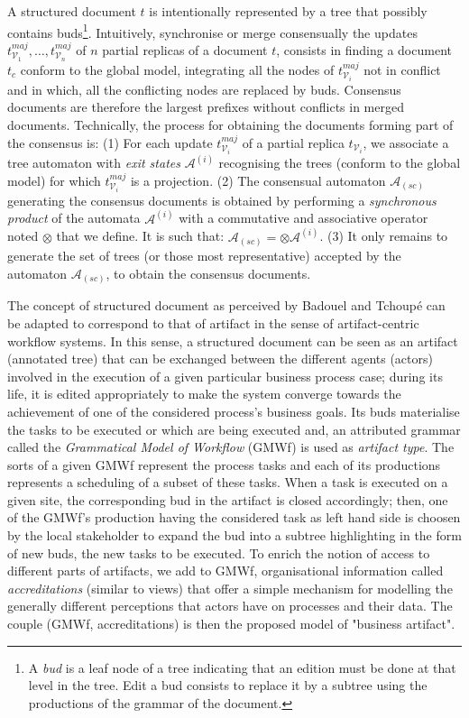 A structured document $t$ is intentionally represented by a tree that possibly contains buds\footnote{A \textit{bud} is a leaf node of a tree indicating that an edition must be done at that level in the tree. Edit a bud consists to replace it by a subtree using the productions of the grammar of the document.}. Intuitively, synchronise or merge consensually the updates $t_{\mathcal{V}_1}^{maj}, \ldots, t_{\mathcal{V}_n}^{maj}$ of $n$ partial replicas of a document $t$, consists in finding a document $t_{c}$ conform to the global model, integrating all the nodes of $t_{\mathcal{V}_i}^{maj}$ not in conflict and in which, all the conflicting nodes are replaced by buds. Consensus documents are therefore the largest prefixes without conflicts in merged documents. 
Technically, the process for obtaining the documents forming part of the consensus is: 
(1) For each update $t_{\mathcal{V}_i}^{maj}$ of a partial replica $t_{\mathcal{V}_i}$, we associate a tree automaton with \textit{exit states} $\mathcal{A}^{(i)}$ recognising the trees (conform to the global model) for which $t_{\mathcal{V}_i}^{maj}$ is a  projection. 
(2) The consensual automaton $\mathcal{A}_{(sc)}$ generating the consensus documents is obtained by performing a \textit{synchronous product} of the automata $\mathcal{A}^{(i)}$ with a commutative and associative operator noted $\otimes$  that we define. It is such that: $\mathcal{A}_{(sc)}=\otimes\mathcal{A}^{(i)}$. 
(3) It only remains to generate the set of trees (or those most representative) accepted by the automaton $\mathcal{A}_{(sc)}$, to obtain the consensus documents.

The concept of structured document as perceived by Badouel and Tchoup\'e can be adapted to correspond to that of artifact in the sense of artifact-centric workflow systems. In this sense, a structured document can be seen as an artifact (annotated tree) that can be exchanged between the different agents (actors) involved in the execution of a given particular business process case; during its life, it is edited appropriately to make the system converge towards the achievement of one of the considered process's business goals. Its buds materialise the tasks to be executed or which are being executed and, an attributed grammar called the \textit{Grammatical Model of Workflow} (GMWf) is used as \textit{artifact type}. The sorts of a given GMWf represent the process tasks and each of its productions represents a scheduling of a subset of these tasks.
When a task is executed on a given site, the corresponding bud in the artifact is closed accordingly; then, one of the GMWf's production having the considered task as left hand side is choosen by the local stakeholder to expand the bud into a subtree highlighting in the form of new buds, the new tasks to be executed. To enrich the notion of access to different parts of artifacts, we add to GMWf, organisational information called \textit{accreditations} (similar to views) that offer a simple mechanism for modelling the generally different perceptions that actors have on processes and their data. The couple (GMWf, accreditations) is then the proposed model of "business artifact".

